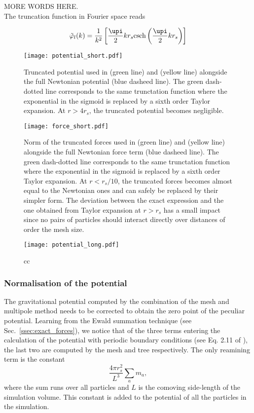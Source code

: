 MORE WORDS HERE.\\

The truncation function in Fourier space reads

\begin{equation}
  \tilde\varphi_l(k) =
  \frac{1}{k^2}\left[\frac{\upi}{2}kr_s\textrm{csch}\left(\frac{\upi}{2}kr_s\right)
    \right]
\end{equation}

\begin{figure}
\texttt{[image: potential\_short.pdf]}
\caption{Truncated potential used in \swift (green line) and \gadget
  (yellow line) alongside the full Newtonian potential (blue dasheed
  line). The green dash-dotted line corresponds to the same
  trunctation function where the exponential in the sigmoid is
  replaced by a sixth order Taylor expansion. At $r>4r_s$, the
  truncated potential becomes negligible.}
\label{fig:fmm:potential_short}
\end{figure}



\begin{figure}
\texttt{[image: force\_short.pdf]}
\caption{Norm of the truncated forces used in \swift (green line) and
  \gadget (yellow line) alongside the full Newtonian force term (blue
  dasheed line). The green dash-dotted line corresponds to the same
  trunctation function where the exponential in the sigmoid is
  replaced by a sixth order Taylor expansion. At $r<r_s/10$, the
  truncated forces becomes almost equal to the Newtonian ones and can
  safely be replaced by their simpler form. The deviation between the
  exact expression and the one obtained from Taylor expansion at
  $r>r_s$ has a small impact since no pairs of particles should
  interact directly over distances of order the mesh size. }
\label{fig:fmm:force_short}
\end{figure}


\begin{figure}
\texttt{[image: potential\_long.pdf]}
\caption{cc}
\label{fig:fmm:potential_long}
\end{figure}


\subsubsection{Normalisation of the potential}

The gravitational potential computed by the combination of the mesh
and multipole method needs to be corrected to obtain the zero point of
the peculiar potential. Learning from the Ewald summation technique
(see Sec.~\ref{ssec:exact_forces}), we notice that of the three terms
entering the calculation of the potential with periodic boundary
conditions (see Eq. 2.11 of \cite{Hernquist1991}), the last two are
computed by the mesh and tree respectively. The only reamining term is
the constant
\begin{equation}
  \frac{4\pi r_s^2}{L^3}\sum_a m_a,
\end{equation}
where the sum runs over all particles and $L$ is the comoving
side-length of the simulation volume. This constant is added to the
potential of all the particles in the simulation.
